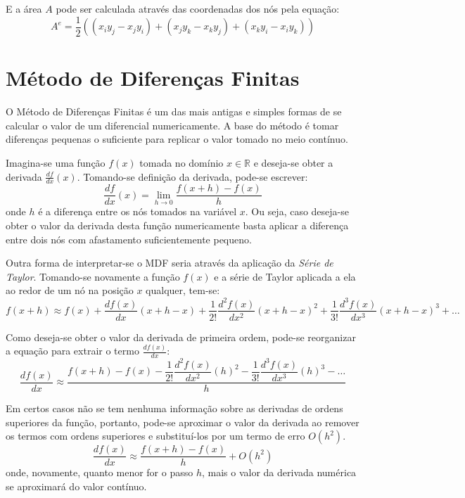 E a área $A$ pode ser calculada através das coordenadas dos nós pela equação:
\begin{equation}
    A^e = \dfrac{1}{2} (
        (x_i y_j - x_j y_i) +
        (x_j y_k - x_k y_j) +
        (x_k y_i - x_i y_k)
    )
\end{equation}


\section{\textbf{Método de Diferenças Finitas}}
\label{mdf}
O Método de Diferenças Finitas é um das mais antigas e simples formas de se calcular o valor de um diferencial numericamente.
A base do método é tomar diferenças pequenas o suficiente para replicar o valor tomado no meio contínuo.

Imagina-se uma função $f(x)$ tomada no domínio $x \in \mathbb{R}$ e deseja-se obter a derivada $\tfrac{df}{dx}(x)$.
Tomando-se definição da derivada, pode-se escrever:
\begin{equation}
    \dfrac{df}{dx}(x) = \lim_{h\to0} \dfrac{f(x+h)-f(x)}{h}
    \label{derivative}
\end{equation}
onde $h$ é a diferença entre os nós tomados na variável $x$.
Ou seja, caso deseja-se obter o valor da derivada desta função numericamente basta aplicar a diferença entre dois nós com afastamento suficientemente pequeno.

Outra forma de interpretar-se o MDF seria através da aplicação da \textit{Série de Taylor}.
Tomando-se novamente a função $f(x)$ e a série de Taylor aplicada a ela ao redor de um nó na posição $x$ qualquer, tem-se:
\begin{equation}
    f(x + h) \approx
    f(x) +
    \dfrac{df(x)}{dx}(x + h - x) +
    \dfrac{1}{2!}\dfrac{d^2f(x)}{dx^2}(x + h - x)^2 +
    \dfrac{1}{3!}\dfrac{d^3f(x)}{dx^3}(x + h - x)^3 +
    \ldots
\end{equation}

Como deseja-se obter o valor da derivada de primeira ordem, pode-se reorganizar a equação para extrair o termo $\tfrac{df(x)}{dx}$:
\begin{equation}
    \dfrac{df(x)}{dx} \approx
    \frac{
        f(x + h) -
        f(x) -
        \dfrac{1}{2!}\dfrac{d^2f(x)}{dx^2}(h)^2 -
        \dfrac{1}{3!}\dfrac{d^3f(x)}{dx^3}(h)^3 -
        \ldots
    }{h}
\end{equation}

Em certos casos não se tem nenhuma informação sobre as derivadas de ordens superiores da função, portanto, pode-se aproximar o valor da derivada ao remover os termos com ordens superiores e substituí-los por um termo de erro $O(h^2)$.
\begin{equation}
    \dfrac{df(x)}{dx} \approx
    \frac{
        f(x + h) -
        f(x)
    }{h} +
    O(h^2)
    \label{dif}
\end{equation}
onde, novamente, quanto menor for o passo $h$, mais o valor da derivada numérica se aproximará do valor contínuo.


